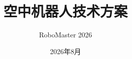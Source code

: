 \documentclass[cn,12pt,base=hide,math=newtx,citestyle=gb7714-2015,bibstyle=gb7714-2015]{elegantbook}
\title{空中机器人技术方案}
\subtitle{RoboMaster 2026}
\author{}
\institute{上海交通大学 \ 云汉交龙}
\date{2026年8月}
\begin{document}
\begin{songti}
\maketitle
\frontmatter

\tableofcontents

\mainmatter











\printbibliography

\end{songti}
\end{document}
